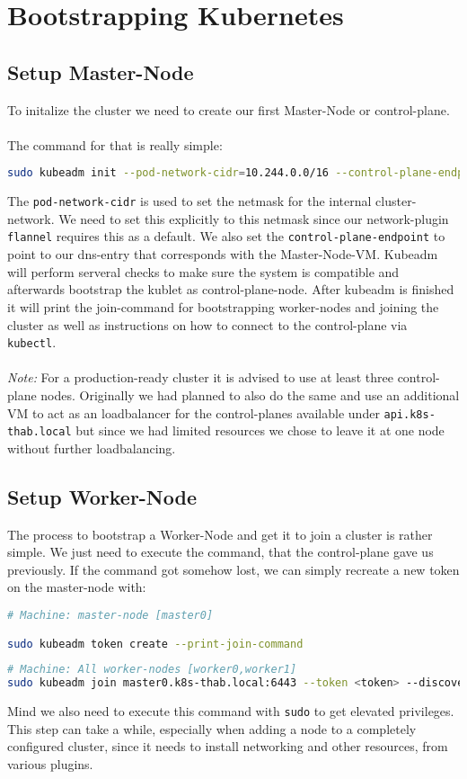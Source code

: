 \section{Bootstrapping Kubernetes}
\subsection{Setup Master-Node}
To initalize the cluster we need to create our first Master-Node or control-plane.\\\\The command for that is really simple:
\begin{lstlisting}[language=bash,caption=Initialize Controle-Plane] 
sudo kubeadm init --pod-network-cidr=10.244.0.0/16 --control-plane-endpoint master0.k8s-thab.local
\end{lstlisting}
The \texttt{pod-network-cidr} is used to set the netmask for the internal cluster-network. We need to set this explicitly to this netmask since our network-plugin \texttt{flannel} requires this as a default.
We also set the \texttt{control-plane-endpoint} to point to our dns-entry that corresponds with the Master-Node-VM.
Kubeadm will perform serveral checks to make sure the system is compatible and afterwards bootstrap the kublet as control-plane-node.
After kubeadm is finished it will print the join-command for bootstrapping worker-nodes and joining the cluster as well as instructions on how to connect to the control-plane via \texttt{kubectl}.\\\\\textit{Note:} For a production-ready cluster it is advised to use at least three control-plane nodes. Originally we had planned to also do the same and use an additional VM to act as an loadbalancer for the control-planes available under \texttt{api.k8s-thab.local} but since we had limited resources we chose to leave it at one node without further loadbalancing.

\subsection{Setup Worker-Node}
The process to bootstrap a Worker-Node and get it to join a cluster is rather simple. We just need to execute the command, that the control-plane gave us previously. If the command got somehow lost, we can simply recreate a new token on the master-node with:
\begin{lstlisting}[language=bash,caption=Get new Join-Token for Worker-Node] 
# Machine: master-node [master0]

sudo kubeadm token create --print-join-command
\end{lstlisting}
\begin{lstlisting}[language=bash,caption=Example Join-Command] 
# Machine: All worker-nodes [worker0,worker1]
sudo kubeadm join master0.k8s-thab.local:6443 --token <token> --discovery-token-ca-cert-hash <sha256-hash>
\end{lstlisting}
Mind we also need to execute this command with \texttt{sudo} to get elevated privileges. This step can take a while, especially when adding a node to a completely configured cluster, since it needs to install networking and other resources, from various plugins.

